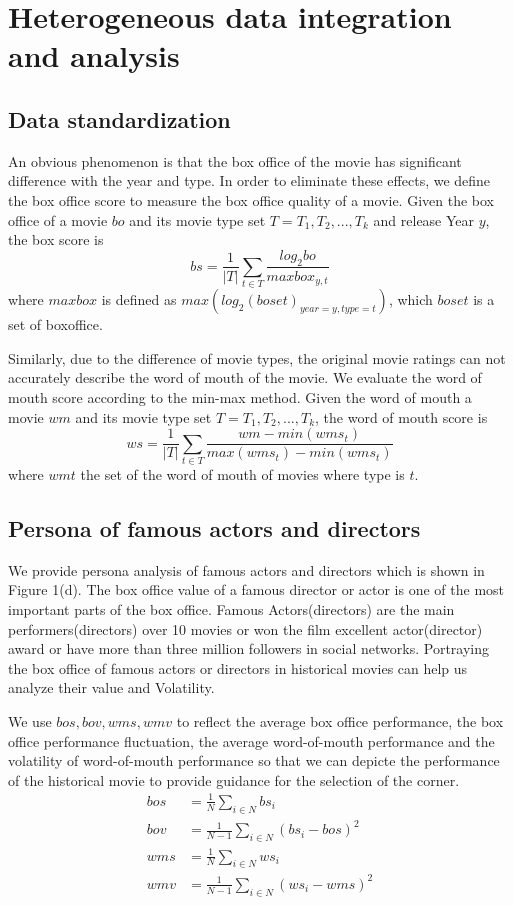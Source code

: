 \section{Heterogeneous data integration and analysis}
\label{sec:analyse}
\subsection{Data standardization}
An obvious phenomenon is that the box office of the movie has significant difference with the year and type. In order to eliminate these effects, we define the box office score to measure the box office quality of a movie. Given the box office of a movie $bo$ and its movie type set $T = {T_1,T_2,...,T_k}$ and release Year $y$, the box score is 
\begin{equation}
bs=\frac{1}{|T|}\sum_{t\in T}\frac{log_2bo}{maxbox_{y,t}}
\end{equation}
where $maxbox$ is defined as $max(log_2(boset)_{year=y,type=t})$, which $boset$ is a set of boxoffice.\\
\par Similarly, due to the difference of movie types, the original movie ratings can not accurately describe the word of mouth of the movie. We evaluate the word of mouth score according to the min-max method. Given the word of mouth a movie $wm$ and its movie type set $T = {T_1,T_2,...,T_k}$, the word of mouth score is 
\begin{equation}
ws=\frac{1}{|T|}\sum_{t\in T}\frac{wm-min(wms_t)}{max(wms_t)-min(wms_t)}
\end{equation}
where $wmt$ the set of the word of mouth of movies where type is $t$.
\subsection{Persona of famous actors and directors}
We provide persona analysis of famous actors and directors which is shown in Figure 1(d). The box office value of a famous director or actor is one of the most important parts of the box office. Famous Actors(directors) are the main performers(directors) over 10 movies or won the film excellent actor(director) award or have more than three million followers in social networks. Portraying the box office of famous actors or directors in historical movies can help us analyze their value and Volatility.
\par We use $bos,bov,wms,wmv$ to reflect the average box office performance, the box office performance fluctuation, the average word-of-mouth performance and the volatility of word-of-mouth performance so that we can depicte the performance of the historical movie to provide guidance for the selection of the corner.
\begin{subequations}
\begin{align}
bos &=  \frac{1}{N}\sum_{i\in N}bs_i\\
bov &= \frac{1}{N-1}\sum_{i\in N}(bs_i-bos)^2\\
wms &=  \frac{1}{N}\sum_{i\in N}ws_i\\
wmv &= \frac{1}{N-1}\sum_{i\in N}(ws_i-wms)^2
\end{align}
\end{subequations}
